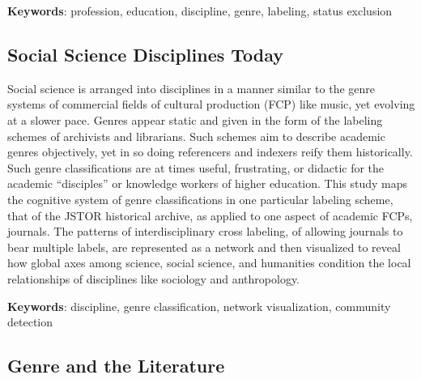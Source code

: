 \documentclass[]{book}
\theoremstyle{definition}
\theoremstyle{definition}
\theoremstyle{definition}
\theoremstyle{remark}
\begin{document}
\textbf{Keywords}: profession, education, discipline, genre, labeling, status
exclusion

\hypertarget{social-science-disciplines-today}{%
\subsection*{Social Science Disciplines
Today}\label{social-science-disciplines-today}}


















Social science is arranged into disciplines in a manner
similar to the genre systems of commercial fields of cultural production
(FCP) like music, yet evolving at a slower pace. Genres appear static
and given in the form of the labeling schemes of archivists and
librarians. Such schemes aim to describe academic genres objectively,
yet in so doing referencers and indexers reify them historically. Such
genre classifications are at times useful, frustrating, or didactic for
the academic ``disciples'' or knowledge workers of higher education.
This study maps the cognitive system of genre classifications in one
particular labeling scheme, that of the JSTOR historical archive, as
applied to one aspect of academic FCPs, journals. The patterns of
interdisciplinary cross labeling, of allowing journals to bear multiple
labels, are represented as a network and then visualized to reveal how
global axes among science, social science, and humanities condition the
local relationships of disciplines like sociology and anthropology.




\textbf{Keywords}: discipline, genre classification, network visualization,
community detection

\hypertarget{genre-and-the-literature}{%
\subsection*{Genre and the Literature}\label{genre-and-the-literature}}
\end{document}
